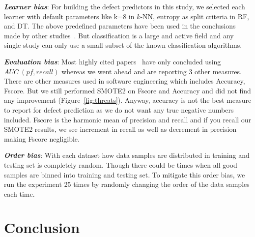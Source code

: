\documentclass[sigconf,review, anonymous]{acmart}
\theoremstyle{break}
\theoremstyle{break}
\begin{document}
\textbf{\textit{Learner bias}}: For building the defect predictors in this
study, we selected each learner with default parameters like k=8 in $k$-NN, entropy as split criteria in RF, and DT. The above predefined parameters have been used in the conclusions made by other studies~\cite{ghotra2015revisiting,tantithamthavorn2016automated}. But classification is a large and active field and any single study can only use a small subset of the known classification algorithms.

\textbf{\textit{Evaluation bias}}: Most highly cited papers~\cite{ghotra2015revisiting,tantithamthavorn2016automated} have only concluded using $AUC\ (pf, recall)$ whereas we went ahead and are reporting 3 other measures. There are other measures used in software engineering which includes Accuracy, Fscore. But we still performed SMOTE2 on Fscore and Accuracy and did not find any improvement (Figure~\ref{fig:threats}). Anyway, accuracy is not the best measure to report for defect prediction as we do not want any true negative numbers included. Fscore is the harmonic mean of precision and recall and if you recall our SMOTE2 results, we see  increment in recall as well as  decrement in precision making Fscore negligible.

\textbf{\textit{Order bias}}: With each dataset how data samples are distributed in training and testing set is completely random. Though there could be times when all good samples are binned into training and testing set. To mitigate this order bias, we run
the experiment 25 times by randomly changing the order of the data samples each time.

\section{Conclusion}
\label{sect:conclusion}
\end{document}
